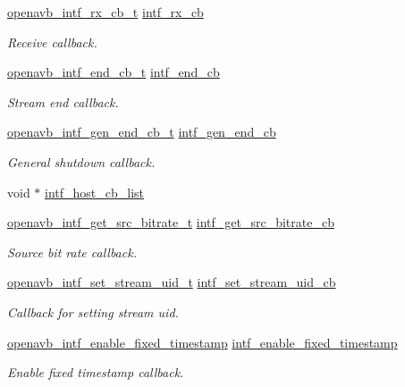 \begin{DoxyCompactItemize}
\hyperlink{include_2openavb__intf__pub_8h_a5dfe7f464c33a0391ca2ade9e562666f}{openavb\+\_\+intf\+\_\+rx\+\_\+cb\+\_\+t} \hyperlink{structopenavb__intf__cb__t_aa29c6a7d59d3dba57131b157f5634040}{intf\+\_\+rx\+\_\+cb}
\begin{DoxyCompactList}\small\item\em Receive callback. \end{DoxyCompactList}\item 
\hyperlink{include_2openavb__intf__pub_8h_a0a5ffd6ad69f2ddd5ea56d40fa5a78e3}{openavb\+\_\+intf\+\_\+end\+\_\+cb\+\_\+t} \hyperlink{structopenavb__intf__cb__t_a438129d3c775eb25b490437fb5d43fbe}{intf\+\_\+end\+\_\+cb}
\begin{DoxyCompactList}\small\item\em Stream end callback. \end{DoxyCompactList}\item 
\hyperlink{include_2openavb__intf__pub_8h_a07729ac21cf3f0f5400412d288324f8d}{openavb\+\_\+intf\+\_\+gen\+\_\+end\+\_\+cb\+\_\+t} \hyperlink{structopenavb__intf__cb__t_af5c808e5bf832dc6f7d8314c80892171}{intf\+\_\+gen\+\_\+end\+\_\+cb}
\begin{DoxyCompactList}\small\item\em General shutdown callback. \end{DoxyCompactList}\item 
void $\ast$ \hyperlink{structopenavb__intf__cb__t_a1fdbb23f1c7df7b98789575ef4f94f6b}{intf\+\_\+host\+\_\+cb\+\_\+list}
\item 
\hyperlink{include_2openavb__intf__pub_8h_abf60bf4b737e4d045cce7d53bcef0964}{openavb\+\_\+intf\+\_\+get\+\_\+src\+\_\+bitrate\+\_\+t} \hyperlink{structopenavb__intf__cb__t_a43b6a9d9343f06ff21f680a90c9529f6}{intf\+\_\+get\+\_\+src\+\_\+bitrate\+\_\+cb}
\begin{DoxyCompactList}\small\item\em Source bit rate callback. \end{DoxyCompactList}\item 
\hyperlink{include_2openavb__intf__pub_8h_af7f3dbf63c593a7b3969c49df4c2d6a1}{openavb\+\_\+intf\+\_\+set\+\_\+stream\+\_\+uid\+\_\+t} \hyperlink{structopenavb__intf__cb__t_ab6c8a87db93fc4d75c94e53b3594bee1}{intf\+\_\+set\+\_\+stream\+\_\+uid\+\_\+cb}
\begin{DoxyCompactList}\small\item\em Callback for setting stream uid. \end{DoxyCompactList}\item 
\hyperlink{include_2openavb__intf__pub_8h_a552396a8e2840febf7c6bd1f285f0563}{openavb\+\_\+intf\+\_\+enable\+\_\+fixed\+\_\+timestamp} \hyperlink{structopenavb__intf__cb__t_a610720587e0f5f8e56e6359b3638cef9}{intf\+\_\+enable\+\_\+fixed\+\_\+timestamp}
\begin{DoxyCompactList}\small\item\em Enable fixed timestamp callback. \end{DoxyCompactList}\end{DoxyCompactItemize}


